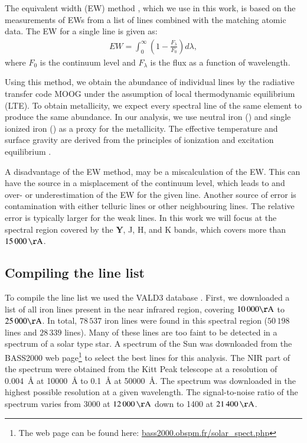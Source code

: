 \documentclass{aa}
\begin{document}
The equivalent width (EW) method
\citep[see e.g.][]{Sousa2008a,Mucciarelli2013,Bensby2014}, which we use
in this work, is based on the measurements of EWs from a list of lines
combined with the matching atomic data. The EW for a single line is
given as:
\begin{align}
    \label{eq:EW}
    EW = \int_0^\infty \left(1 - \frac{F_\lambda}{F_0}\right) d\lambda,
\end{align}
where $F_0$ is the continuum level and $F_\lambda$ is the flux as a
function of wavelength.

Using this method, we obtain the abundance of individual lines by
the radiative transfer code MOOG \citep[][version 2013]{Sneden1973}
under the assumption of local thermodynamic equilibrium (LTE). To
obtain metallicity, we expect every spectral line of the same element
to produce the same abundance. In our analysis, we use neutral iron
() and single ionized iron () as a proxy for
the metallicity. The effective temperature and surface gravity are
derived from the principles of ionization and excitation equilibrium
\citep[see][]{Gray2006}.


A disadvantage of the EW method, may be a miscalculation of the EW. This
can have the source in a misplacement of the continuum level, which
leads to and over- or underestimation of the EW for the given line.
Another source of error is contamination with either telluric lines or
other neighbouring lines. The relative error is typically larger for the
weak lines. In this work we will focus at the spectral region covered by
the \textbf{Y}, J, H, and K bands, which covers more than $\SI{15000}{\AA}$.



\subsection{Compiling the line list}

To compile the line list we used the VALD3 database \citep{VALD1,VALD2}.
First, we downloaded a list of all iron lines present in the near
infrared region, covering $10\,000\si{\AA}$ to $25\,000\si{\AA}$.
In total, $78\,537$ iron lines were found in this spectral region
($50\,198$  lines and $28\,339$  lines).
Many of these lines are too faint to be detected in a spectrum
of a solar type star. A spectrum of the Sun was downloaded from
the BASS2000 web page\footnote{The web page can be found here:
\url{bass2000.obspm.fr/solar_spect.php}} to select the best lines
for this analysis. The NIR part of the spectrum were obtained from
the Kitt Peak telescope \citep{Hinkle1995} at a resolution of
\SI{0.004}{\angstrom} at \SI{10000}{\angstrom} to \SI{0.1}{\angstrom}
at \SI{50000}{\angstrom}. The spectrum was downloaded in the highest
possible resolution at a given wavelength. The signal-to-noise ratio
of the spectrum varies from 3000 at $\SI{12000}{\AA}$ down to 1400 at
$\SI{21400}{\AA}$.
\end{document}

